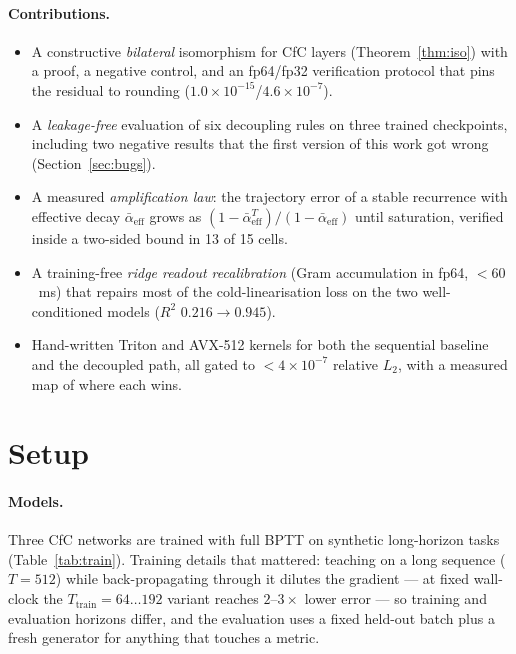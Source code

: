 \documentclass[11pt]{article}
\theoremstyle{definition}
\newcommand{\abar}{\bar{\alpha}_{\mathrm{eff}}}
\newcommand{\code}[1]{\texttt{\detokenize{#1}}}
\begin{document}
\paragraph{Contributions.}
\begin{itemize}[leftmargin=1.4em]
\item A constructive \emph{bilateral} isomorphism for CfC layers (Theorem~\ref{thm:iso}) with a proof, a
      negative control, and an fp64/fp32 verification protocol that pins the residual to rounding
      ($1.0\times10^{-15}$/$4.6\times10^{-7}$).
\item A \emph{leakage-free} evaluation of six decoupling rules on three trained checkpoints, including
      two negative results that the first version of this work got wrong (Section~\ref{sec:bugs}).
\item A measured \emph{amplification law}: the trajectory error of a stable recurrence with effective
      decay $\abar$ grows as $(1-\abar^T)/(1-\abar)$ until saturation, verified inside a two-sided bound in
      13 of 15 cells.
\item A training-free \emph{ridge readout recalibration} (Gram accumulation in fp64, $<60$~ms) that repairs
      most of the cold-linearisation loss on the two well-conditioned models ($R^2$ $0.216\to0.945$).
\item Hand-written Triton and AVX-512 kernels for both the sequential baseline and the decoupled path, all
      gated to $<4\times10^{-7}$ relative $L_2$, with a measured map of where each wins.
\end{itemize}

\section{Setup}

\paragraph{Models.} Three CfC networks are trained with full BPTT on synthetic long-horizon tasks
(Table~\ref{tab:train}). Training details that mattered: teaching on a long sequence ($T=512$) while
back-propagating through it dilutes the gradient --- at fixed wall-clock the $T_{\text{train}}=64\dots192$
variant reaches $2$--$3\times$ lower error --- so training and evaluation horizons differ, and the
evaluation uses a fixed held-out batch plus a fresh generator for anything that touches a metric.
\begin{table}[H]
\centering
\caption{Trained checkpoints (\code{results/phase1_training.json}). Horizons are five cumulative
windows of the $T$-step rollout.}
\label{tab:train}
\small

\end{table}
\end{document}
